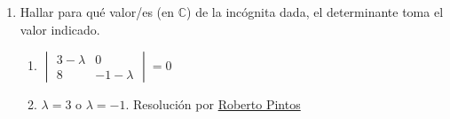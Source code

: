 \documentclass[a4paper]{article}
\newcommand{\answer}{\item[**]}
\newcommand{\exercise}{\item}
\begin{document}
\begin{enumerate}
\begin{multicols}{3}
\begin{enumerate} [label=(\alph*)]
		\item $A=\begin{pmatrix} 2 & 3 & 0 \\ -4 & 4 & 1 \\ 7 & 1 & -1\end{pmatrix}$
		\answer $\det(A)=-1$ por lo que $\exists A^{-1}=\begin{pmatrix} 5 & -3 & -3\\ -3 & 2 & 2 \\ 32 & -19 & -20 \end{pmatrix}$.

		\item $A=\begin{pmatrix} 2 & 4 & 1 \\ -5 & 4 & 5 \\ 3 & 1 & -1\end{pmatrix}$
		\answer $\det(A)=5$ por lo que $\exists A^{-1}=\begin{pmatrix} -\frac{9}{5} & 1 & \frac{16}{5}\\ 2 & -1 & -3 \\ -\frac{17}{5} & 2 & \frac{28}{5} \end{pmatrix}$.

		\item $A=\begin{pmatrix} 1 & 3 & 2 \\ -2 & 3 & 3 \\ -1 & 15 & 12 \end{pmatrix}$
		\answer $\det(A)=0$ por lo que $\nexists A^{-1}$.

		\item $D=\begin{pmatrix} 4 & 14 & -17 & 1 \\ 0 & 1 & 23 & 1 \\ 0 & 0 & 0 & 3 \\ 0 & 0 & 0 & 12 \end{pmatrix}$
		\answer $\det(D)=0$ por lo que $\nexists D^{-1}$.

	\end{enumerate}
	\end{multicols}

	\exercise Hallar para qué valor/es (en $\mathbb{C}$) de la incógnita dada, el determinante toma el valor indicado.
	\begin{multicols}{2}
	\begin{enumerate} [label=(\alph*)]
		
		\item $\begin{vmatrix} 3-\lambda & 0 \\ 8 & -1-\lambda \end{vmatrix}=0$
		\answer $\lambda=3$ o $\lambda=-1$. Resolución por \href{https://youtu.be/Rw531O86QVw?t=376}{Roberto Pintos}


\end{enumerate}
\end{multicols}
\end{enumerate}
\end{document}
